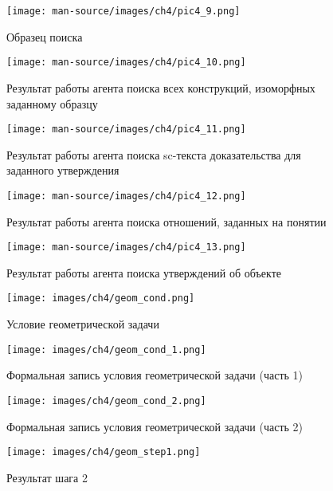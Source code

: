 \documentclass{thesisby}
\begin{document}
\begin{figure}[H]
    \centering
    \texttt{[image: man-source/images/ch4/pic4\_9.png]}
    \caption{Образец поиска}
    \label{fig:pic4_9}
\end{figure}


\begin{figure}[H]
    \centering
    \texttt{[image: man-source/images/ch4/pic4\_10.png]}
    \caption{Результат работы агента поиска всех конструкций, изоморфных заданному образцу}
    \label{fig:pic4_10}
\end{figure}


\begin{figure}[H]
    \centering
    \texttt{[image: man-source/images/ch4/pic4\_11.png]}
    \caption{Результат работы агента поиска sc-текста доказательства для заданного утверждения}
    \label{fig:pic4_11}
\end{figure}


\begin{figure}[H]
    \centering
    \texttt{[image: man-source/images/ch4/pic4\_12.png]}
    \caption{Результат работы агента поиска отношений, заданных на понятии}
    \label{fig:pic4_12}
\end{figure}


\begin{figure}[H]
    \centering
    \texttt{[image: man-source/images/ch4/pic4\_13.png]}
    \caption{Результат работы агента поиска утверждений об объекте}
    \label{fig:pic4_13}
\end{figure}


\begin{figure}[H]
    \centering
    \texttt{[image: images/ch4/geom\_cond.png]}
    \caption{Условие геометрической задачи}
    \label{fig:pic_geom_cond}
\end{figure}


\begin{figure}[H]
    \centering
    \texttt{[image: images/ch4/geom\_cond\_1.png]}
    \caption{Формальная запись условия геометрической задачи (часть 1)}
    \label{fig:pic_geom_cond_1}
\end{figure}


\begin{figure}[H]
    \centering
    \texttt{[image: images/ch4/geom\_cond\_2.png]}
    \caption{Формальная запись условия геометрической задачи (часть 2)}
    \label{fig:pic_geom_cond_2}
\end{figure}


\begin{figure}[H]
    \centering
    \texttt{[image: images/ch4/geom\_step1.png]}
    \caption{Результат шага 2}
    \label{fig:pic_geom_step_1}
\end{figure}
\end{document}
